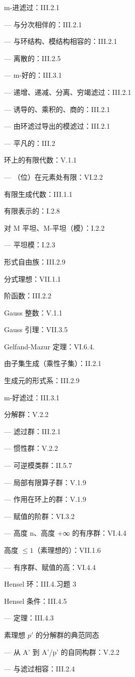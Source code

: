 m-进滤过：III.2.1

--- 与分次相伴的：III.2.1

--- 与环结构、模结构相容的：III.2.1

--- 离散的：III.2.5

--- m-好的：III.3.1

--- 递增、递减、分离、穷竭滤过：III.2.1

--- 诱导的、乘积的、商的：III.2.1

--- 由环滤过导出的模滤过：III.2.1

--- 平凡的：III.2

环上的有限代数：V.1.1

--- （位）在元素处有限：VI.2.2

有限生成代数：III.1.1

有限表示的：I.2.8

对 M 平坦、M-平坦（模）：I.2.2

--- 平坦模：I.2.3

形式自由族：III.2.9

分式理想：VII.1.1

阶函数：III.2.2

Gauss 整数：V.1.1

Gauss 引理：VII.3.5

Gelfand-Mazur 定理：VI.6.4.

由子集生成（乘性子集）：II.2.1

生成元的形式系：III.2.9

m-好滤过：III.3.1

分解群：V.2.2

--- 滤过群：III.2.1

--- 惯性群：V.2.2

--- 可逆模类群：II.5.7

--- 局部有限算子群：V.1.9

--- 作用在环上的群：V.1.9

--- 赋值的阶群：VI.3.2

--- 高度 n、高度 +∞ 的有序群：VI.4.4

高度 \(\leqslant 1\)（素理想的）：VII.1.6

--- 有序群、赋值的高：VI.4.4

Hensel 环：III.4.习题 3

Hensel 条件：III.4.5

--- 定理：III.4.3

素理想 \(p'\) 的分解群的典范同态

--- 从 A' 到 A'/p' 的自同构群：V.2.2

--- 与滤过相容：III.2.4

